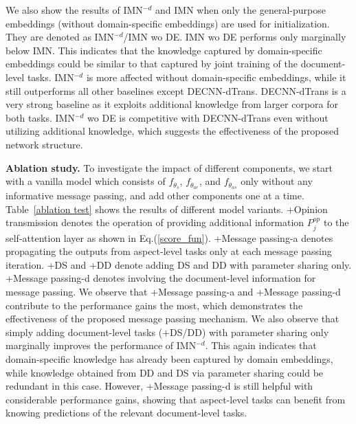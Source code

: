 \documentclass[11pt,a4paper]{article}
\begin{document}
\renewcommand{\arraystretch}{1.2}
\begin{table}[t]
\centering
\small
{}
\caption{F1 scores with different $T$ values using IMN$^{-d}$. Average results over 5 runs are reported.}\label{vary T}
\end{table}

 We also show the results of IMN$^{-d}$ and IMN when only the general-purpose embeddings (without domain-specific embeddings) are used for initialization. They are denoted as IMN$^{-d}$/IMN wo DE. IMN wo DE performs only marginally below IMN. This indicates that the knowledge captured by domain-specific embeddings could be similar to that captured by joint training of the document-level tasks. IMN$^{-d}$ is more affected without domain-specific embeddings, while it still outperforms all other baselines except DECNN-dTrans. DECNN-dTrans is a very strong baseline as it exploits additional knowledge from larger corpora for both tasks. IMN$^{-d}$ wo DE is competitive with DECNN-dTrans even without utilizing additional knowledge, which suggests the effectiveness of the proposed network structure. 
\medskip


\noindent\textbf{Ablation study.} To investigate the impact of different components, we start with a vanilla model which consists of $f_{\theta_s}$, $f_{\theta_{ae}}$, and $f_{\theta_{as}}$ only without any informative message passing, and add other components one at a time. Table~\ref{ablation test} shows the results of different model variants. +Opinion transmission denotes the operation of providing additional information $P_j^{op}$ to the self-attention layer as shown in Eq.(\ref{score_fun}). +Message passing-a denotes propagating the outputs from aspect-level tasks only at each message passing iteration. +DS and +DD denote adding DS and DD with parameter sharing only.  +Message passing-d denotes involving the document-level information for message passing.  We observe that +Message passing-a and +Message passing-d contribute to the performance gains the most, which demonstrates the effectiveness of the proposed message passing mechanism. We also observe that simply adding document-level tasks (+DS/DD) with parameter sharing only marginally improves the performance of IMN$^{-d}$. This again indicates that domain-specific knowledge has already been captured by domain embeddings, while knowledge obtained from DD and DS via parameter sharing could be redundant in this case. However, +Message passing-d is still helpful with considerable performance gains, showing that aspect-level tasks can benefit from knowing predictions of the relevant document-level tasks. 
\medskip
\end{document}
